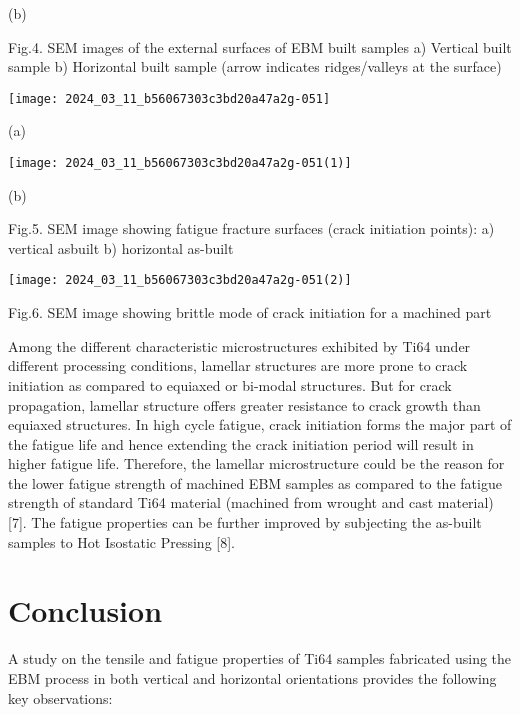 \documentclass[10pt]{article}
\begin{document}
(b)

Fig.4. SEM images of the external surfaces of EBM built samples a) Vertical built sample b) Horizontal built sample (arrow indicates ridges/valleys at the surface)

\begin{center}
\texttt{[image: 2024\_03\_11\_b56067303c3bd20a47a2g-051]}
\end{center}

(a)

\begin{center}
\texttt{[image: 2024\_03\_11\_b56067303c3bd20a47a2g-051(1)]}
\end{center}

(b)

Fig.5. SEM image showing fatigue fracture surfaces (crack initiation points): a) vertical asbuilt b) horizontal as-built

\begin{center}
\texttt{[image: 2024\_03\_11\_b56067303c3bd20a47a2g-051(2)]}
\end{center}

Fig.6. SEM image showing brittle mode of crack initiation for a machined part

Among the different characteristic microstructures exhibited by Ti64 under different processing conditions, lamellar structures are more prone to crack initiation as compared to equiaxed or bi-modal structures. But for crack propagation, lamellar structure offers greater resistance to crack growth than equiaxed structures. In high cycle fatigue, crack initiation forms the major part of the fatigue life and hence extending the crack initiation period will result in higher fatigue life. Therefore, the lamellar microstructure could be the reason for the lower fatigue strength of machined EBM samples as compared to the fatigue strength of standard Ti64 material (machined from wrought and cast material) [7]. The fatigue properties can be further improved by subjecting the as-built samples to Hot Isostatic Pressing [8].

\section*{Conclusion}
A study on the tensile and fatigue properties of Ti64 samples fabricated using the EBM process in both vertical and horizontal orientations provides the following key observations:
\end{document}
